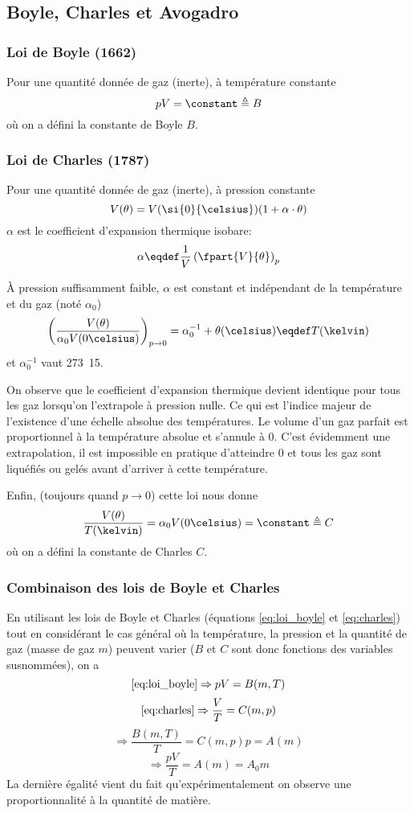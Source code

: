 \subsection{Boyle, Charles et Avogadro}
\subsubsection{Loi de Boyle (1662)}
Pour une quantité donnée de gaz (inerte), à température constante
\begin{equation} \label{eq:loi_boyle}
pV = \constant \triangleq B
\end{equation}
où on a défini la constante de Boyle $B$.
\subsubsection{Loi de Charles (1787)}
Pour une quantité donnée de gaz (inerte), à pression constante
\[ V(\theta) = V(\si{0}{\celsius})(1 + \alpha \cdot \theta) \]
$\alpha$ est le coefficient d'expansion thermique isobare:
\[ \alpha \eqdef
\frac{1}{V}\left(\fpart{V}{\theta}\right)_p \]

À pression suffisamment faible,
$\alpha$ est constant et indépendant de la température et du gaz (noté $\alpha_0$)
\[ \left(\frac{V(\theta)}{\alpha_0 V(0\celsius)}\right)_{p\rightarrow 0} =
\alpha_0^{-1}+\theta(\celsius) \eqdef T(\kelvin) \]
et $\alpha_0^{-1}$ vaut \si{273.15}{\celsius}.

On observe que le coefficient d'expansion thermique devient identique
pour tous les gaz lorsqu'on l'extrapole à pression nulle.
Ce qui est l'indice majeur de l'existence
d'une échelle absolue des températures.
Le volume d'un gaz parfait est proportionnel à la température absolue et
s'annule à \si{0}{\kelvin}.
C'est évidemment une extrapolation, il est impossible en pratique d'atteindre
\si{0}{\kelvin} et tous les gaz sont liquéfiés ou
gelés avant d'arriver à cette température.

Enfin, (toujours quand $p \rightarrow 0$) cette loi nous donne
\begin{equation} \label{eq:charles}
\dfrac{V(\theta)}{T(\kelvin)} = \alpha_0 V(0\celsius) = \constant \triangleq C
\end{equation}
où on a défini la constante de Charles $C$.

\subsubsection{Combinaison des lois de Boyle et Charles}
En utilisant les lois de Boyle et Charles (équations \eqref{eq:loi_boyle} et \eqref{eq:charles}) tout en considérant le cas général où la température, la pression et la quantité de gaz (masse de gaz $m$) peuvent varier ($B$ et $C$ sont donc fonctions des variables susnommées), on a
\[ \eqref{eq:loi_boyle} \Rightarrow pV = B(m,T) \]
\[ \eqref{eq:charles} \Rightarrow \frac{V}{T} = C(m,p) \]
\[ \Rightarrow \frac{B(m,T)}{T} = C(m,p)p = A(m) \]
\[ \Rightarrow \frac{pV}{T} = A(m) = A_0m \]
La dernière égalité vient du fait qu'expérimentalement on observe
une proportionnalité à la quantité de matière.

